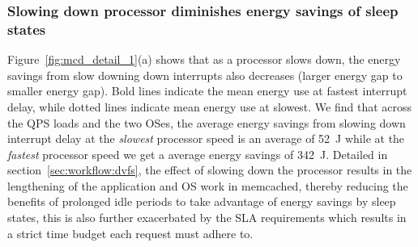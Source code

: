 \subsubsection{Slowing down processor diminishes energy savings of sleep states}
\label{sec:mcd:slowprocvssleep}
Figure~\ref{fig:mcd_detail_1}(a) shows that as a processor slows down, the energy savings from slow downing down interrupts also decreases (larger energy gap to smaller energy gap). Bold lines indicate the mean energy use at fastest interrupt delay, while dotted lines indicate mean energy use at slowest. We find that across the QPS loads and the two OSes, the average energy savings from slowing down interrupt delay at the \textit{slowest} processor speed is an average of \SI{52}{\joule} while at the \textit{fastest} processor speed we get a average energy savings of \SI{342}{\joule}. Detailed in section~\ref{sec:workflow:dvfs}, the effect of slowing down the processor results in the lengthening of the application and OS work in memcached, thereby reducing the benefits of prolonged idle periods to take advantage of energy savings by sleep states, this is also further exacerbated by the SLA requirements which results in a strict time budget each request must adhere to. 

